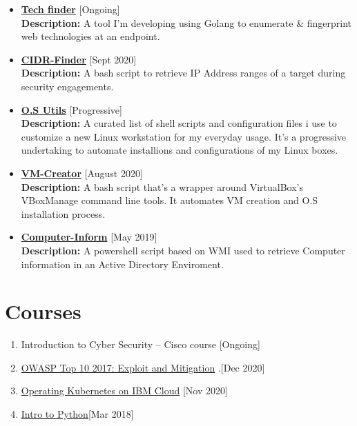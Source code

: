 \documentclass[11pt,a4paper]{moderncv}
\begin{document}
\begin{itemize}	

	\item\textbf{\href{https://github.com/BabyBabaBabu/tech-finder}{Tech finder}}  \hfill [Ongoing]\\
	\textbf{Description:}
A tool I'm developing using Golang to enumerate \& fingerprint web technologies at an endpoint.

	\item\textbf{\href{https://github.com/BabyBabaBabu/cidr-finder}{CIDR-Finder}} \hfill [Sept 2020]\\
	\textbf{Description:}
A bash script to retrieve IP Address ranges of a target during security engagements.
	
	\item\textbf{\href{https://github.com/BabyBabaBabu/tweaks}{O.S Utils}} \hfill [Progressive]\\
	\textbf{Description:}
A curated list of shell scripts and configuration files i use to customize a new Linux workstation for my everyday usage. It's a progressive undertaking to automate installions and configurations of my Linux boxes.

	\item\textbf{{\href{https://github.com/BabyBabaBabu/vm-creator}{VM-Creator}}} \hfill[August 2020]\\
	\textbf{Description:}
A bash script that's a wrapper around VirtualBox's VBoxManage command line tools. It automates VM creation and O.S installation process.

	\item\textbf{\href{https://github.com/BabyBabaBabu/computer-inform}{Computer-Inform}} \hfill[May 2019]\\
	\textbf{Description:}
	A powershell script based on WMI used to retrieve Computer information in an Active Directory Enviroment.

\end{itemize}

\section{Courses}

\begin{enumerate}  	
	
\item Introduction to Cyber Security { -- } Cisco course \hfill[Ongoing]

\item {\href{https://www.udemy.com/certificate/UC-ca1a3435-4c63-48cd-9905-d67d0ca89592/} {OWASP Top 10 2017: Exploit and Mitigation} }.\hfill [Dec 2020]

\item {\href{https://www.youracclaim.com/badges/35fc2e5b-aa0a-49f5-9083-8b7032c1efcb?source=linked_in_profile} {Operating Kubernetes on IBM Cloud} }\hfill [Nov 2020]

\item {\href{https://app.cybrary.it/courses/api/certificate/C-d79617a9d0-a9ae436/view}{Intro to Python}}\hfill [Mar 2018]		
\end{enumerate}
\end{document}
